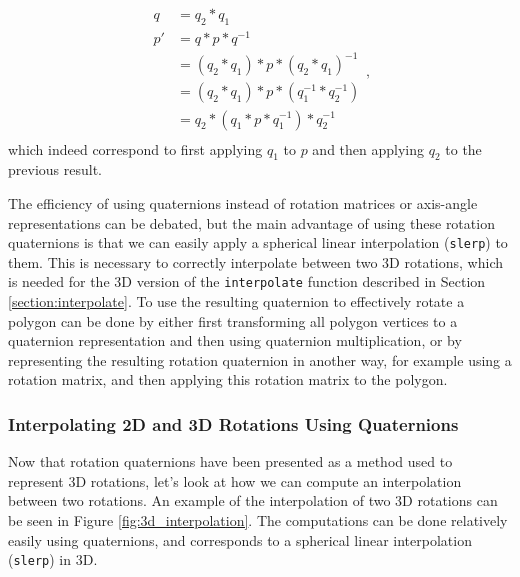 \begin{equation}
\begin{split}
    q   & = q_2*q_1 \\
    p'  & = q*p*q^{-1} \\
        & = (q_2*q_1)*p*(q_2*q_1)^{-1} \\
        & =  (q_2*q_1)*p*(q_1^{-1}*q_2^{-1}) \\
        & = q_2*(q_1*p*q_1^{-1})*q_2^{-1} \\
\end{split}, 
\end{equation}
which indeed correspond to first applying \( q_1 \) to \( p \) and then applying \( q_2 \) to the previous result.

The efficiency of using quaternions instead of rotation matrices or axis-angle representations can be debated, but the main advantage of using these rotation quaternions is that we can easily apply a spherical linear interpolation (\lstinline{slerp}) to them. This is necessary to correctly interpolate between two 3D rotations, which is needed for the 3D version of the \lstinline{interpolate} function described in Section \ref{section:interpolate}. To use the resulting quaternion to effectively rotate a polygon can be done by either first transforming all polygon vertices to a quaternion representation and then using quaternion multiplication, or by representing the resulting rotation quaternion in another way, for example using a rotation matrix, and then applying this rotation matrix to the polygon.

\subsubsection{Interpolating 2D and 3D Rotations Using Quaternions}

Now that rotation quaternions have been presented as a method used to represent 3D rotations, let's look at how we can compute an interpolation between two rotations. An example of the interpolation of two 3D rotations can be seen in Figure \ref{fig:3d_interpolation}. The computations can be done relatively easily using quaternions, and corresponds to a spherical linear interpolation (\lstinline{slerp}) in 3D.

